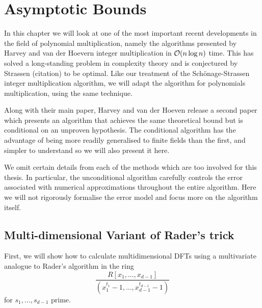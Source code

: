 \chapter{Asymptotic Bounds}\label{chp:asymptotic}

In this chapter we will look at one of the most important recent developments in the field of polynomial multiplication, namely the algorithms presented by Harvey and van der Hoevern \cite{nlogn} integer multiplication in $\mathcal O(n \log n)$ time. This has solved a long-standing problem in complexity theory and is conjectured by Strassen (citation) to be optimal. Like our treatment of the Sch\"{o}nage-Strassen integer multiplication algorithm, we will adapt the algorithm for polynomials multiplication, using the same technique.

\medskip

Along with their main paper, Harvey and van der Hoeven release a second paper \cite{ffnlogn} which presents an algorithm that achieves the same theoretical bound but is conditional on an unproven hypothesis. The conditional algorithm has the advantage of being more readily generalised to finite fields than the first, and simpler to understand so we will also present it here.

\medskip

We omit certain details from each of the methods which are too involved for this thesis. In particular, the unconditional algorithm carefully controls the error associated with numerical approximations throughout the entire algorithm. Here we will not rigorously formalise the error model and focus more on the algorithm itself.


\section{Multi-dimensional Variant of Rader's trick}%
\label{sec:multi_dimensional_variant_of_rader_s_trick}

First, we will show how to calculate multidimensional DFTs using a multivariate analogue to Rader's algorithm in the ring
\[
    \frac{R[x_1, \ldots, x_{d-1}]}{(x_1^{t_1} - 1, \ldots, x_{d-1}^{t_{d-1}} - 1)} 
\]
for $s_1, \ldots, s_{d-1}$ prime.





